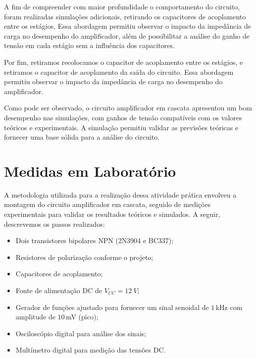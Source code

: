 
A fim de compreender com maior profundidade o comportamento do circuito, foram realizadas simulações adicionais, retirando os capacitores de acoplamento entre os estágios. Essa abordagem permitiu observar o impacto da impedância de carga no desempenho do amplificador, além de possibilitar a análise do ganho de tensão em cada estágio sem a influência dos capacitores.


Por fim, retiramos recolocamos o capacitor de acoplamento entre os estágios, e retiramos o capacitor de acoplamento da saída do circuito. Essa abordagem permitiu observar o impacto da impedância de carga no desempenho do amplificador.


Como pode ser observado, o circuito amplificador em cascata apresentou um bom desempenho nas simulações, com ganhos de tensão compatíveis com os valores teóricos e experimentais. A simulação permitiu validar as previsões teóricas e fornecer uma base sólida para a análise do circuito.

\section{Medidas em Laboratório}

A metodologia utilizada para a realização dessa atividade prática envolveu a montagem do circuito amplificador em cascata, seguido de medições experimentais para validar os resultados teóricos e simulados. A seguir, descrevemos os passos realizados:

\begin{itemize}
    \item Dois transistores bipolares NPN (2N3904 e BC337);
    \item Resistores de polarização conforme o projeto;
    \item Capacitores de acoplamento;
    \item Fonte de alimentação DC de $V_{CC} = 12~V$;
    \item Gerador de funções ajustado para fornecer um sinal senoidal de $1\,$kHz com amplitude de $10\,$mV (pico);
    \item Osciloscópio digital para análise dos sinais;
    \item Multímetro digital para medição das tensões DC.
\end{itemize}

